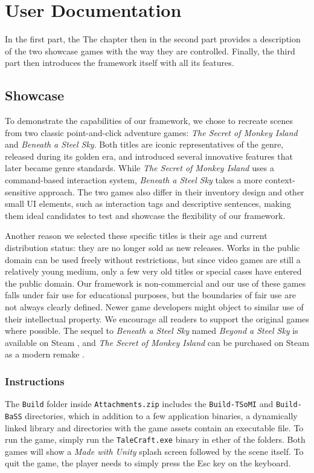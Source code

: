 \chapter{User Documentation}
In the first part, the 
The chapter then in the second part provides a description of the two showcase games with the way they are controlled. Finally, the third part then introduces the framework itself with all its features.


\section{Showcase}
To demonstrate the capabilities of our framework, we chose to recreate scenes from two classic point-and-click adventure games: \textit{The Secret of Monkey Island} and \textit{Beneath a Steel Sky}. Both titles are iconic representatives of the genre, released during its golden era, and introduced several innovative features that later became genre standards. While \textit{The Secret of Monkey Island} uses a command-based interaction system, \textit{Beneath a Steel Sky} takes a more context-sensitive approach. The two games also differ in their inventory design and other small UI elements, such as interaction tags and descriptive sentences, making them ideal candidates to test and showcase the flexibility of our framework.

Another reason we selected these specific titles is their age and current distribution status: they are no longer sold as new releases. Works in the public domain can be used freely without restrictions, but since video games are still a relatively young medium, only a few very old titles or special cases have entered the public domain.
Our framework is non-commercial and our use of these games falls under fair use for educational purposes, but the boundaries of fair use are not always clearly defined. 
Newer game developers might object to similar use of their intellectual property. We encourage all readers to support the original games where possible. The sequel to \textit{Beneath a Steel Sky} named \textit{Beyond a Steel Sky} is available on Steam \cite{Beyond-a-Steel-Sky}, and \textit{The Secret of Monkey Island} can be purchased on Steam as a modern remake \cite{TSoMI-steam}.

\subsection{Instructions}
The \verb|Build| folder inside \verb|Attachments.zip| includes the \verb|Build-TSoMI| and \verb|Build-BaSS| directories, which in addition to a few application binaries, a dynamically linked library and directories with the game assets contain an executable file. To run the game, simply run the \verb|TaleCraft.exe| binary in ether of the folders. Both games will show a \textit{Made with Unity }splash screen followed by the scene itself. To quit the game, the player needs to simply press the Esc key on the keyboard.


